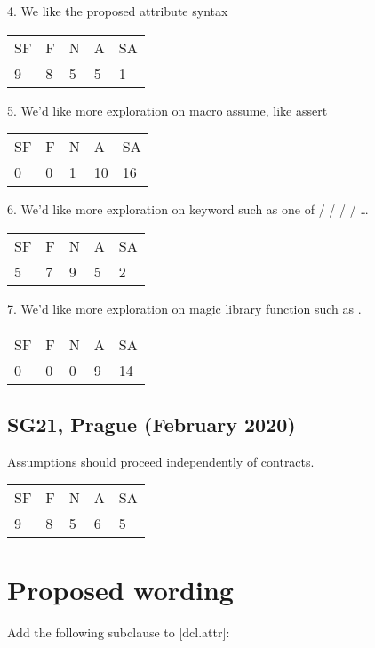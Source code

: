 4. We like the proposed attribute syntax 

\hspace{6mm}
\begin{tabular}{lllll}
SF & F & N & A & SA \\
9 & 8 & 5 & 5 & 1
\end{tabular}

5. We’d like more exploration on macro assume, like assert

\hspace{6mm}
\begin{tabular}{lllll}
SF & F & N & A & SA \\
0 & 0 & 1 & 10 & 16
\end{tabular}

6. We’d like more exploration on keyword such as one of  /  /  /  / …

\hspace{6mm}
\begin{tabular}{lllll}
SF & F & N & A & SA \\
5 & 7 & 9 & 5 & 2
\end{tabular}

7. We’d like more exploration on magic library function such as .

\hspace{6mm}
\begin{tabular}{lllll}
SF & F & N & A & SA \\
0 & 0 & 0 & 9 & 14
\end{tabular}

\subsection{SG21, Prague (February 2020)}

Assumptions should proceed independently of contracts.

\hspace{6mm}
\begin{tabular}{lllll}
SF & F & N & A & SA \\
9 & 8 & 5 & 6 & 5
\end{tabular}

\section{Proposed wording}

Add the following subclause to [dcl.attr]:

